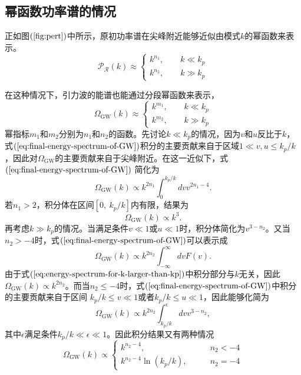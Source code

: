 \subsection{幂函数功率谱的情况}
正如图$(\ref{fig:pert})$中所示，原初功率谱在尖峰附近能够近似由模式$k$的幂函数来表示。
\begin{equation}
  \mathcal{P}_{\mathcal{R}}(k) \approx
  \begin{cases}
    k^{n_1},  \qquad k \ll k_{p} \\
    k^{n_2}, \qquad k \gg k_{p}
  \end{cases}
\end{equation}

在这种情况下，引力波的能谱也能通过分段幂函数来表示，
\begin{equation}
  \Omega_{\text{GW}}(k) \approx
  \begin{cases}
    k^{m_1}, \qquad k \ll k_{p} \\
    k^{m_2}, \qquad k\gg k_{p}
  \end{cases}
\end{equation}
幂指标$m_1$和$m_2$分别为$n_1$和$n_2$的函数。先讨论$k\ll
k_{p}$的情况，因为$v$和$u$反比于$k$，式$(\ref{eq:final-energy-spectrum-of-GW})$积分的主要贡献来自于区域$1\ll
v,u\le k_{p}
/k$，因此对$\Omega_{\text{GW}}$的主要贡献来自于尖峰附近。在这一近似下，式$(\ref{eq:final-energy-spectrum-of-GW})$
简化为
\begin{equation}
  \Omega_{\text{GW}}(k) \propto k^{2n_1} \int_{0}^{k_{p} /k} dv v^{2n_1-4}.
\end{equation}
若$n_1 > 2$，积分体在区间$ \left[ 0,\ k_{p}/k \right]$内有限，结果为
\begin{equation}
  \Omega_{\text{GW}}(k) \propto k^3. 
\end{equation}
再考虑$k\gg k_{p}$的情况。当满足条件$v\ll 1$或$u\ll
1$时，积分体简化为$v^{3-n_2}$。又当$n_2 >
-4$时，式$(\ref{eq:final-energy-spectrum-of-GW})$可以表示成
\begin{equation}
  \label{eq:energy-spectrum-for-k-larger-than-kp}
  \Omega_{\text{GW}}(k) \propto k^{2n_2} \int_{-\infty}^{\infty} dv F(v).  
\end{equation}
由于式$(\ref{eq:energy-spectrum-for-k-larger-than-kp})$中积分部分与$k$无关，因此$\Omega_{\text{GW}}(k)
\propto k^{2n_2}$。而当$n_2\le
-4$时，式$(\ref{eq:final-energy-spectrum-of-GW})$中积分的主要贡献来自于区间
$k_{p}/k \le v\ll 1$或者$k_{p}/k \le u\ll 1$，因此能够化简为
\begin{equation}
  \Omega_{\text{GW}}(k) \propto k^{2n_2} \int_{k_{p}/k}^{\epsilon} dv
  v^{3-n_2},   
\end{equation}
其中$\epsilon$满足条件$k_{p}/k\ll \epsilon\ll 1$。因此积分结果又有两种情况
\begin{equation}
  \Omega_{\text{GW}}(k) \propto
  \begin{cases}
    k^{n_2-4} , \qquad & n_2 < -4 \\
    k^{n_2-4}\ln (k_{p}/k), \qquad & n_2= -4
  \end{cases}
\end{equation}

